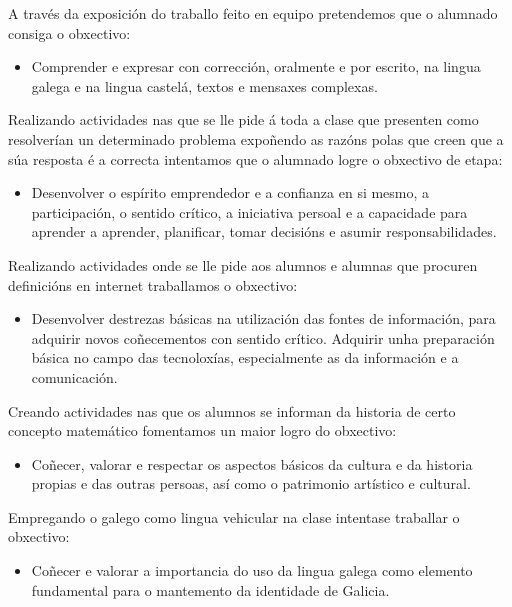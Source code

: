 A través da exposición do traballo feito en equipo pretendemos que o alumnado consiga o obxectivo:

\begin{itemize}
    \item Comprender e expresar con corrección, oralmente e por escrito, na lingua galega e na lingua castelá, textos e mensaxes complexas.
\end{itemize}

Realizando actividades nas que se lle pide á toda a clase que presenten como resolverían un determinado problema expoñendo as razóns polas que creen que a súa resposta é a correcta intentamos que o alumnado logre o obxectivo de etapa:
\begin{itemize}
    \item Desenvolver o espírito emprendedor e a confianza en si mesmo, a participación, o sentido crítico, a iniciativa persoal e a capacidade para aprender a aprender, planificar, tomar decisións e asumir responsabilidades.
\end{itemize}

Realizando actividades onde se lle pide aos alumnos e alumnas que procuren definicións en internet traballamos o obxectivo:
\begin{itemize}
    \item Desenvolver destrezas básicas na utilización das fontes de información, para adquirir novos coñecementos con sentido crítico. Adquirir unha preparación básica no campo das tecnoloxías, especialmente as da información e a comunicación.
\end{itemize}

Creando actividades nas que os alumnos se informan da historia de certo concepto matemático fomentamos un maior logro do obxectivo:

\begin{itemize}
    \item Coñecer, valorar e respectar os aspectos básicos da cultura e da historia propias e das outras persoas, así como o patrimonio artístico e cultural.
\end{itemize}

Empregando o galego como lingua vehicular na clase intentase traballar o obxectivo:

\begin{itemize}
    \item Coñecer e valorar a importancia do uso da lingua galega como elemento fundamental para o mantemento da identidade de Galicia.
\end{itemize}


